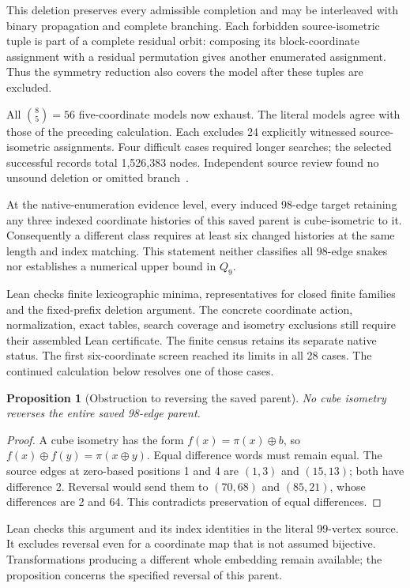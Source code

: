 \documentclass[11pt,a4paper]{article}
\newtheorem{proposition}[theorem]{Proposition}
\theoremstyle{definition}
\theoremstyle{remark}
\begin{document}
This deletion preserves every admissible completion and may be
interleaved with binary propagation and complete branching. Each
forbidden source-isometric tuple is part of a complete residual
orbit: composing its block-coordinate assignment with a residual
permutation gives another enumerated assignment. Thus the symmetry
reduction also covers the model after these tuples are excluded.

All $\binom85=56$ five-coordinate models now exhaust. The literal
models agree with those of the preceding calculation. Each excludes
24 explicitly witnessed source-isometric assignments. Four difficult
cases required longer searches; the selected successful records
total 1,526,383 nodes. Independent source review found no unsound
deletion or omitted branch~\cite{research207}.

At the native-enumeration evidence level, every induced 98-edge
target retaining any three indexed coordinate histories of this
saved parent is cube-isometric to it. Consequently a different
class requires at least six changed histories at the same length
and index matching. This statement neither classifies all 98-edge
snakes nor establishes a numerical upper bound in $Q_9$.

Lean checks finite lexicographic minima, representatives for closed
finite families and the fixed-prefix deletion argument. The concrete
coordinate action, normalization, exact tables, search coverage and
isometry exclusions still require their assembled Lean certificate.
The finite census retains its separate native status. The first
six-coordinate screen reached its limits in all 28 cases. The
continued calculation below resolves one of those cases.

\begin{proposition}[Obstruction to reversing the saved parent]
No cube isometry reverses the entire saved 98-edge parent.
\end{proposition}
\begin{proof}
A cube isometry has the form $f(x)=\pi(x)\oplus b$, so
$f(x)\oplus f(y)=\pi(x\oplus y)$. Equal difference words must
remain equal. The source edges at zero-based positions 1 and 4
are $(1,3)$ and $(15,13)$; both have difference 2. Reversal would
send them to $(70,68)$ and $(85,21)$, whose differences are 2 and
64. This contradicts preservation of equal differences.
\end{proof}
Lean checks this argument and its index identities in the literal
99-vertex source. It excludes reversal even for a coordinate map
that is not assumed bijective. Transformations producing a different
whole embedding remain available; the proposition concerns the
specified reversal of this parent.
\end{document}
